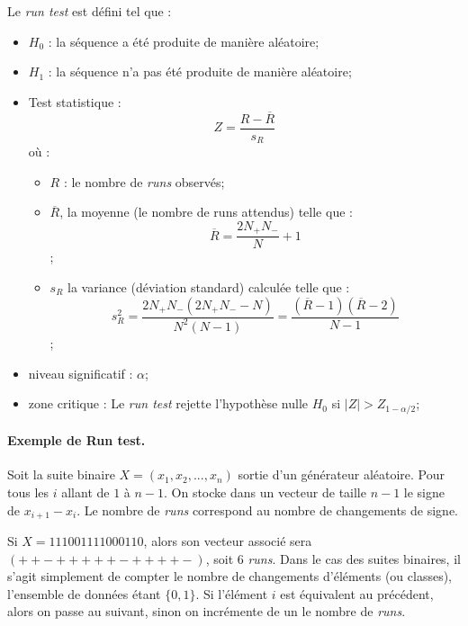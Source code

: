 Le \textit{run test} est défini tel que : 
\begin{itemize}
\item $H_0$ : la séquence a été produite de manière aléatoire;
\item $H_1$ : la séquence n'a pas été produite de manière aléatoire;
\item Test statistique : 
	$$ Z = \frac{R - \overline{R}}{s_R}$$
	où : 
	\begin{itemize}
	\item $R$ : le nombre de \textit{runs} observés;
	\item $\overline{R}$, la moyenne (le nombre de runs attendus) telle que :
	$$\overline{R}= \frac{2 N_+ N_-}{N}+1$$;
	\item $s_R$ la variance (déviation standard) calculée telle que : 
	$$s_R^2 = \frac{2 N_+ N_-(2N_+ N_- -N)}{N^2(N-1)} = \frac{(\overline{R}-1)(\overline{R}-2)}{N-1}$$;
	\end{itemize}
\item niveau significatif : $\alpha$;
\item zone critique : Le \textit{run test} rejette l'hypothèse nulle $H_0$ si $ |Z| > Z_{1-\alpha/2}$;

\end{itemize}


\paragraph{Exemple de Run test.\\}
Soit la suite binaire $X=(x_1,x_2,...,x_n)$ sortie d'un générateur aléatoire. Pour tous les $i$ allant de $1$ à $n-1$. On stocke dans un vecteur de taille $n-1$ le signe de $x_{i+1}-x_i$. Le nombre de \textit{runs} correspond au nombre de changements de signe.

Si $X=111001111000110$, alors son vecteur associé sera $(++-+++++-++++-)$, soit 6 \textit{runs}. Dans le cas des suites binaires, il s'agit simplement de compter le nombre de changements d'éléments (ou classes), l'ensemble de données étant $\lbrace 0,1 \rbrace$. Si l'élément $i$ est équivalent au précédent, alors on passe au suivant, sinon on incrémente de un le nombre de \textit{runs}.\\

